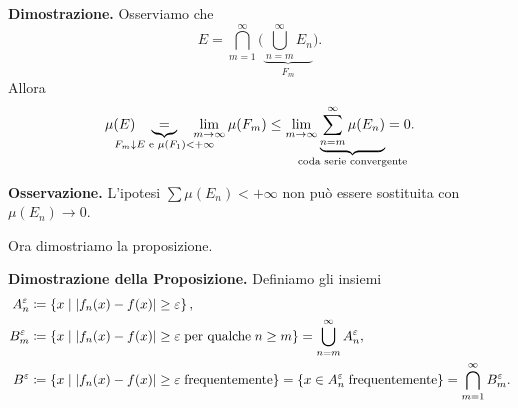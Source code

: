 \textbf{Dimostrazione.}
Osserviamo che
%
$$
E = \bigcap_{m=1}^\infty \Big( \underbrace{\bigcup_{n=m}^\infty E_n}_{F_m} \Big).
$$
%
Allora
%
$$
\mu(E) \quad \underbrace{=}_{\mathclap{F_m \downarrow E \text{ e } \mu(F_1) < +\infty}} \quad  \lim_{m \to \infty} \mu(F_m) \leq \lim_{m \to \infty} \underbrace{\sum_{n=m}^{\infty} \mu(E_n)}_{\mathclap{\text{coda serie convergente}}} = 0.
$$
%

\textbf{Osservazione.}
L'ipotesi $\sum \mu(E_n) < +\infty$ non può essere sostituita con $\mu(E_n) \to 0$.

Ora dimostriamo la proposizione.

\textbf{Dimostrazione della Proposizione.} Definiamo gli insiemi
\begin{align*}
A_n^\varepsilon & \coloneqq \left\{ x \;\middle|\; \left| f_n(x) - f(x) \right| \geq \varepsilon \right\}, \\
B_m^\varepsilon & \coloneqq \left\{ x \;\middle|\; \left| f_n(x) - f(x) \right| \geq \varepsilon \; \text{per qualche} \; n \geq m\right\} = \bigcup_{n = m}^\infty A_n^\varepsilon, \\
B^\varepsilon & \coloneqq \left\{ x \;\middle|\; \left| f_n(x) - f(x) \right| \geq \varepsilon \; \text{frequentemente}  \right\} = \left\{ x \in A_n^\varepsilon \; \text{frequentemente}  \right\} = \bigcap_{m = 1}^\infty B_m^\varepsilon.
\end{align*}

